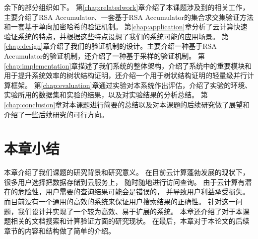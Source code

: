 余下的部分组织如下。
第\ref{chap:relatedwork}章介绍了本课题涉及到的相关工作，主要介绍了RSA Accumulator、一套基于RSA Accumulator的集合求交集验证方法和一套基于单向加密哈希的验证机制。
第\ref{chap:application}章分析了云计算快速验证系统的特点，并根据这些特点设想了我们的系统可能的应用场景。
第\ref{chap:design}章介绍了我们的验证机制的设计。主要介绍一种基于RSA Accumulator的验证机制，还介绍了一种基于采样的验证机制。
第\ref{chap:implementation}章描述了我们系统的整体架构，介绍了系统中的重要模块和用于提升系统效率的树状结构证明，还介绍一个用于树状结构证明的轻量级并行计算框架。
第\ref{chap:evaluation}章通过实验对本系统作出评估，介绍了实验的环境、实验所用的数据集和实验的结果，以及对实验结果的分析总结。
第\ref{chap:conclusion}章对本课题进行简要的总结以及对本课题的后续研究做了展望和介绍了一些后续研究的可行方向。


\section{本章小结}
本章介绍了我们课题的研究背景和研究意义。
在目前云计算蓬勃发展的现状下，很多用户选择把数据存储到云服务上，
随时随地进行访问查询。
由于云计算有潜在的危险性，用户需要的查询结果可能会是错误的，
并导致用户利益承受损失。
而目前没有一个通用的高效的系统来保证用户搜索结果的正确性。
针对这一问题，我们设计并实现了一个较为高效、易于扩展的系统。
本章还介绍了对于本课题相关的文档搜索和计算验证方面的研究现状。
在最后，本章对于本论文的后续章节的内容和结构做了简单的介绍。
